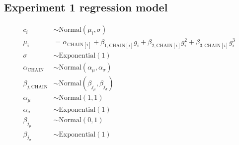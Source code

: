 \documentclass[doc,biblatex]{apa7}
\begin{document}
\subsection{Experiment 1 regression model}

	\begin{equation}
	\begin{aligned}
	   c_i                   & \sim \mathrm{Normal}(\mu_i, \sigma) \\
	 \mu_i                   & = \alpha_{\mathrm{CHAIN}[i]} + \beta_{1,\mathrm{CHAIN}[i]} g_i + \beta_{2,\mathrm{CHAIN}[i]} g_i^2 + \beta_{3,\mathrm{CHAIN}[i]} g_i^3 \\
	\sigma                   & \sim \mathrm{Exponential}(1) \\
	\alpha_{\mathrm{CHAIN}}  & \sim \mathrm{Normal}(\alpha_\mu, \alpha_\sigma) \\
	\beta_{j,\mathrm{CHAIN}} & \sim \mathrm{Normal}(\beta_{j_\mu}, \beta_{j_\sigma}) \\
	\alpha_\mu               & \sim \mathrm{Normal}(1, 1) \\
	\alpha_\sigma            & \sim \mathrm{Exponential}(1) \\
	\beta_{j_\mu}            & \sim \mathrm{Normal}(0, 1) \\
	\beta_{j_\sigma}         & \sim \mathrm{Exponential}(1)
	\end{aligned}
	\end{equation}
\end{document}
